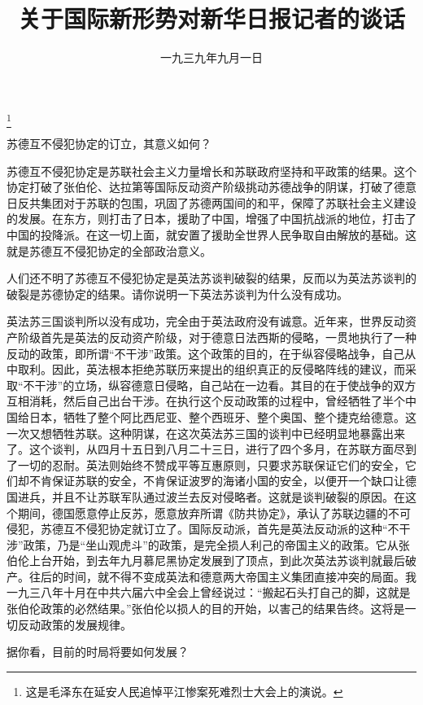 
\title{关于国际新形势对新华日报记者的谈话}
\date{一九三九年九月一日}
\thanks{这是毛泽东在延安人民追悼平江惨案死难烈士大会上的演说。}
\maketitle


苏德互不侵犯协定的订立，其意义如何？

苏德互不侵犯协定是苏联社会主义力量增长和苏联政府坚持和平政策的结果。这个协定打破了张伯伦、达拉第等国际反动资产阶级挑动苏德战争的阴谋，打破了德意日反共集团对于苏联的包围，巩固了苏德两国间的和平，保障了苏联社会主义建设的发展。在东方，则打击了日本，援助了中国，增强了中国抗战派的地位，打击了中国的投降派。在这一切上面，就安置了援助全世界人民争取自由解放的基础。这就是苏德互不侵犯协定的全部政治意义。

人们还不明了苏德互不侵犯协定是英法苏谈判破裂的结果，反而以为英法苏谈判的破裂是苏德协定的结果。请你说明一下英法苏谈判为什么没有成功。

英法苏三国谈判所以没有成功，完全由于英法政府没有诚意。近年来，世界反动资产阶级首先是英法的反动资产阶级，对于德意日法西斯的侵略，一贯地执行了一种反动的政策，即所谓“不干涉”政策。这个政策的目的，在于纵容侵略战争，自己从中取利。因此，英法根本拒绝苏联历来提出的组织真正的反侵略阵线的建议，而采取“不干涉”的立场，纵容德意日侵略，自己站在一边看。其目的在于使战争的双方互相消耗，然后自己出台干涉。在执行这个反动政策的过程中，曾经牺牲了半个中国给日本，牺牲了整个阿比西尼亚、整个西班牙、整个奥国、整个捷克给德意。这一次又想牺牲苏联。这种阴谋，在这次英法苏三国的谈判中已经明显地暴露出来了。这个谈判，从四月十五日到八月二十三日，进行了四个多月，在苏联方面尽到了一切的忍耐。英法则始终不赞成平等互惠原则，只要求苏联保证它们的安全，它们却不肯保证苏联的安全，不肯保证波罗的海诸小国的安全，以便开一个缺口让德国进兵，并且不让苏联军队通过波兰去反对侵略者。这就是谈判破裂的原因。在这个期间，德国愿意停止反苏，愿意放弃所谓《防共协定》，承认了苏联边疆的不可侵犯，苏德互不侵犯协定就订立了。国际反动派，首先是英法反动派的这种“不干涉”政策，乃是“坐山观虎斗”的政策，是完全损人利己的帝国主义的政策。它从张伯伦上台开始，到去年九月慕尼黑协定发展到了顶点，到此次英法苏谈判就最后破产。往后的时间，就不得不变成英法和德意两大帝国主义集团直接冲突的局面。我一九三八年十月在中共六届六中全会上曾经说过：“搬起石头打自己的脚，这就是张伯伦政策的必然结果。”张伯伦以损人的目的开始，以害己的结果告终。这将是一切反动政策的发展规律。

据你看，目前的时局将要如何发展？

